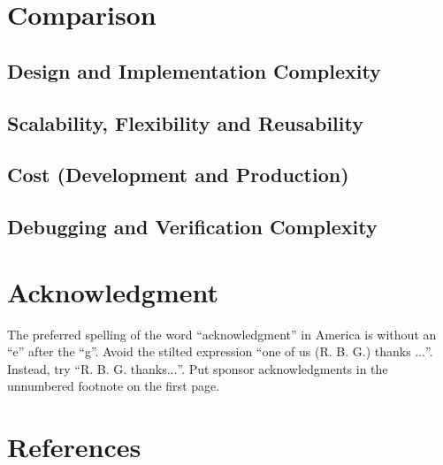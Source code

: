 \documentclass[conference]{IEEEtran}
\begin{document}
\section{Comparison}
\subsection{Design and Implementation Complexity}
\subsection{Scalability, Flexibility and Reusability}
\subsection{Cost (Development and Production)}
\subsection{Debugging and Verification Complexity}

\section*{Acknowledgment}

The preferred spelling of the word ``acknowledgment'' in America is without 
an ``e'' after the ``g''. Avoid the stilted expression ``one of us (R. B. 
G.) thanks $\ldots$''. Instead, try ``R. B. G. thanks$\ldots$''. Put sponsor 
acknowledgments in the unnumbered footnote on the first page.

\section*{References}

\printbibliography
\end{document}
